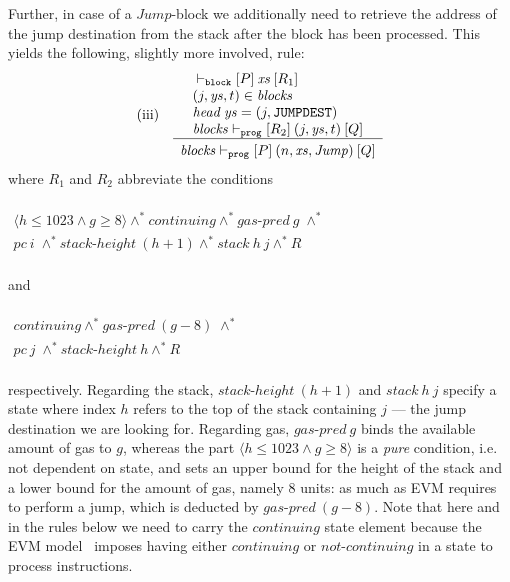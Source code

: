 \documentclass[sigplan,10pt]{acmart}\settopmatter{printfolios=true,printccs=false,printacmref=false}
\newcommand{\sconj}{\wedge^*}
\newcommand{\ttrip}[5]{\mathit{#1} \vdash_{\mathrm{#2}}[#3]\:#4\:[#5]}
\newcommand{\cont}{\mathit{continuing}}
\newcommand{\ncont}{\mathit{not\mbox{-}continuing}}
\newcommand{\pc}{\mathit{pc}}
\newcommand{\gaspred}{\mathit{gas\mbox{-}pred}}
\newcommand{\stackh}{\mathit{stack\mbox{-}height}}
\newcommand{\stack}{\mathit{stack}}
\newcommand{\instr}[1]{\mathtt{#1}}
\newcommand{\pure}[1]{\langle#1\rangle}
\newcommand{\hd}{\mathit{head}\:}
\newcommand{\RuleC}[2]{\begin{array}{c}#1\\\hline\noalign{\smallskip}#2\end{array}}
\begin{document}
Further, in case of a $\mathit{Jump}$-block we additionally need to retrieve the address of the jump 
destination from the stack 
after the block has been processed. This yields the following, slightly more involved, rule:
\[
\begin{array}{l l}
\mbox{(iii)} & \RuleC{\begin{array}{l}\ttrip{}{\mathtt{block}}{P}{\mathit{xs}}{R_1} \\
                                      (j, \mathit{ys},t) \in \mathit{blocks} \\
                                      \hd\mathit{ys} = (j, \instr{JUMPDEST}) \\
                                      \ttrip{\mathit{blocks}}{\mathtt{prog}}{R_2}{(j, \mathit{ys},t)}{Q}
                      \end{array}}
     {\ttrip{\mathit{blocks}}{\mathtt{prog}}{P}{(n, \mathit{xs}, \mathit{Jump})}{Q}}
\end{array}
\]
where $R_1$ and $R_2$ abbreviate the conditions \\
\\$
\begin{array}{l}
\pure{h \le 1023 \wedge g \geq 8} \sconj \cont \sconj \gaspred\:g \; \sconj \\
\pc\:i \; \sconj \stackh\:(h + 1) \sconj \stack\:h\:j \sconj R 
\end{array}
$\\ 
\\
and\\
\\$
\begin{array}{l}
\cont \sconj \gaspred\:(g - 8) \; \sconj \\
\pc\:j \; \sconj \stackh\:h \sconj R 
\end{array}
$\\
\\respectively. 
Regarding the stack, $\stackh\:(h + 1)$ and $\stack\:h\:j$ specify a state where
index $h$ refers to the top of the stack containing $j$ --- the jump destination we are looking for.
Regarding gas, $\gaspred\:g$
binds the available amount of gas to $g$, whereas 
the part $\pure{h \le 1023 \wedge g \geq 8}$ is a \emph{pure} condition,
i.e. not dependent on state, and sets an upper bound for the height of
the stack and a lower bound for the amount of gas, namely $8$ units: 
as much as EVM requires to perform a jump, which is deducted by $\gaspred\:(g - 8)$.   
Note that here and in the rules below we need to carry the $\cont$ state element because the EVM model~\cite{Yoichi}
imposes having either $\cont$ or $\ncont$ in a state to process instructions.
\end{document}
